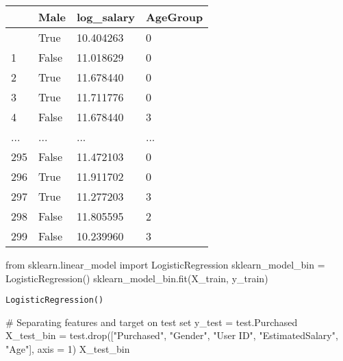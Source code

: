 \documentclass[
  letterpaper,
  DIV=11,
  numbers=noendperiod]{scrreprt}
\newenvironment{Shaded}{\begin{snugshade}}{\end{snugshade}}
\newcommand{\CommentTok}[1]{\textcolor[rgb]{0.37,0.37,0.37}{#1}}
\newcommand{\DecValTok}[1]{\textcolor[rgb]{0.68,0.00,0.00}{#1}}
\newcommand{\ImportTok}[1]{\textcolor[rgb]{0.00,0.46,0.62}{#1}}
\newcommand{\NormalTok}[1]{\textcolor[rgb]{0.00,0.23,0.31}{#1}}
\newcommand{\OperatorTok}[1]{\textcolor[rgb]{0.37,0.37,0.37}{#1}}
\newcommand{\StringTok}[1]{\textcolor[rgb]{0.13,0.47,0.30}{#1}}
\begin{document}
\begin{longtable}[]{@{}llll@{}}
\toprule\noalign{}
& Male & log\_salary & AgeGroup \\
\midrule\noalign{}
\endhead
\bottomrule\noalign{}
\endlastfoot
0 & True & 10.404263 & 0 \\
1 & False & 11.018629 & 0 \\
2 & True & 11.678440 & 0 \\
3 & True & 11.711776 & 0 \\
4 & False & 11.678440 & 3 \\
... & ... & ... & ... \\
295 & False & 11.472103 & 0 \\
296 & True & 11.911702 & 0 \\
297 & True & 11.277203 & 3 \\
298 & False & 11.805595 & 2 \\
299 & False & 10.239960 & 3 \\
\end{longtable}

\begin{Shaded}
\begin{Highlighting}[]
\ImportTok{from}\NormalTok{ sklearn.linear\_model }\ImportTok{import}\NormalTok{ LogisticRegression}
\NormalTok{sklearn\_model\_bin }\OperatorTok{=}\NormalTok{ LogisticRegression()}
\NormalTok{sklearn\_model\_bin.fit(X\_train, y\_train)}
\end{Highlighting}
\end{Shaded}

\begin{verbatim}
LogisticRegression()
\end{verbatim}

\begin{Shaded}
\begin{Highlighting}[]
\CommentTok{\# Separating features and target on test set}
\NormalTok{y\_test }\OperatorTok{=}\NormalTok{ test.Purchased}
\NormalTok{X\_test\_bin }\OperatorTok{=}\NormalTok{ test.drop([}\StringTok{"Purchased"}\NormalTok{, }\StringTok{"Gender"}\NormalTok{, }\StringTok{"User ID"}\NormalTok{, }\StringTok{"EstimatedSalary"}\NormalTok{, }\StringTok{"Age"}\NormalTok{], axis }\OperatorTok{=} \DecValTok{1}\NormalTok{)}
\NormalTok{X\_test\_bin}
\end{Highlighting}
\end{Shaded}
\end{document}
